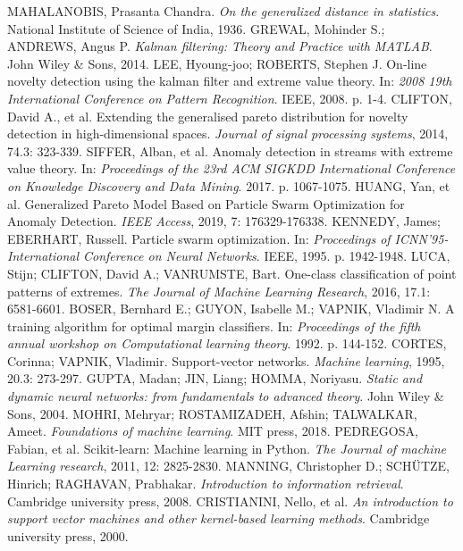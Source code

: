 \documentclass[11pt,twoside,openright]{report}
\begin{document}
\begin{thebibliography}{L}
MAHALANOBIS, Prasanta Chandra. \textit{On the generalized distance in statistics}. National Institute of Science of India, 1936.
GREWAL, Mohinder S.; ANDREWS, Angus P. \textit{Kalman filtering: Theory and Practice with MATLAB}. John Wiley \& Sons, 2014.
LEE, Hyoung-joo; ROBERTS, Stephen J. On-line novelty detection using the kalman filter and extreme value theory. In: \textit{2008 19th International Conference on Pattern Recognition}. IEEE, 2008. p. 1-4.
CLIFTON, David A., et al. Extending the generalised pareto distribution for novelty detection in high-dimensional spaces. \textit{Journal of signal processing systems}, 2014, 74.3: 323-339.
SIFFER, Alban, et al. Anomaly detection in streams with extreme value theory. In: \textit{Proceedings of the 23rd ACM SIGKDD International Conference on Knowledge Discovery and Data Mining}. 2017. p. 1067-1075.
HUANG, Yan, et al. Generalized Pareto Model Based on Particle Swarm Optimization for Anomaly Detection. \textit{IEEE Access}, 2019, 7: 176329-176338.
KENNEDY, James; EBERHART, Russell. Particle swarm optimization. In: \textit{Proceedings of ICNN'95-International Conference on Neural Networks}. IEEE, 1995. p. 1942-1948.
LUCA, Stijn; CLIFTON, David A.; VANRUMSTE, Bart. One-class classification of point patterns of extremes. \textit{The Journal of Machine Learning Research}, 2016, 17.1: 6581-6601.
BOSER, Bernhard E.; GUYON, Isabelle M.; VAPNIK, Vladimir N. A training algorithm for optimal margin classifiers. In: \textit{Proceedings of the fifth annual workshop on Computational learning theory}. 1992. p. 144-152.
CORTES, Corinna; VAPNIK, Vladimir. Support-vector networks. \textit{Machine learning}, 1995, 20.3: 273-297.
GUPTA, Madan; JIN, Liang; HOMMA, Noriyasu. \textit{Static and dynamic neural networks: from fundamentals to advanced theory}. John Wiley \& Sons, 2004.
MOHRI, Mehryar; ROSTAMIZADEH, Afshin; TALWALKAR, Ameet. \textit{Foundations of machine learning}. MIT press, 2018.
PEDREGOSA, Fabian, et al. Scikit-learn: Machine learning in Python. \textit{The Journal of machine Learning research}, 2011, 12: 2825-2830.
MANNING, Christopher D.; SCHÜTZE, Hinrich; RAGHAVAN, Prabhakar. \textit{Introduction to information retrieval}. Cambridge university press, 2008.
CRISTIANINI, Nello, et al. \textit{An introduction to support vector machines and other kernel-based learning methods}. Cambridge university press, 2000.

\end{thebibliography}
\end{document}
